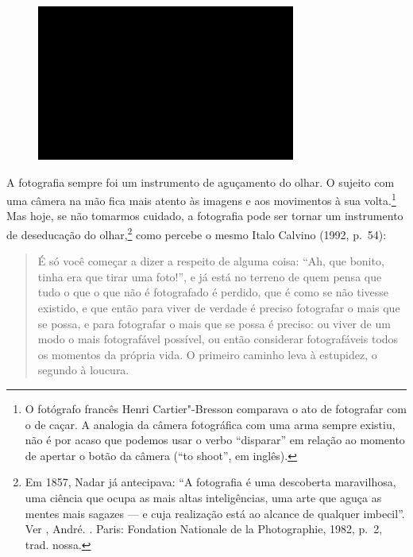 \begin{figure}[!ht]
\centering
 \includegraphics[width=85mm]{./imgs/im1.jpg}
\caption{\tiny{}}
\end{figure}

A fotografia sempre foi um instrumento de aguçamento do olhar. O sujeito
com uma câmera na mão fica mais atento às imagens e aos movimentos à sua
volta.\footnote{O fotógrafo francês Henri Cartier"-Bresson comparava o
  ato de fotografar com o de caçar. A analogia da câmera fotográfica com
  uma arma sempre existiu, não é por acaso que podemos usar o verbo
  ``disparar'' em relação ao momento de apertar o botão da câmera (``to
  shoot'', em inglês).} Mas hoje, se não tomarmos cuidado, a fotografia
pode ser tornar um instrumento de deseducação do olhar,\footnote{Em
  1857, Nadar já antecipava: ``A fotografia é uma descoberta
  maravilhosa, uma ciência que ocupa as mais altas inteligências, uma
  arte que aguça as mentes mais sagazes --- e cuja realização está ao
  alcance de qualquer imbecil''. Ver , André. {}.
  Paris: Fondation Nationale de la Photographie, 1982, p.~2, trad.
  nossa.} como percebe o mesmo Italo Calvino (1992, p.~54):

\begin{quote}
É só você começar a dizer a respeito de alguma coisa: ``Ah, que bonito,
tinha era que tirar uma foto!'', e já está no terreno de quem pensa que
tudo o que o que não é fotografado é perdido, que é como se não tivesse
existido, e que então para viver de verdade é preciso fotografar o mais
que se possa, e para fotografar o mais que se possa é preciso: ou viver
de um modo o mais fotografável possível, ou então considerar
fotografáveis todos os momentos da própria vida. O primeiro caminho leva
à estupidez, o segundo à loucura.
\end{quote}

